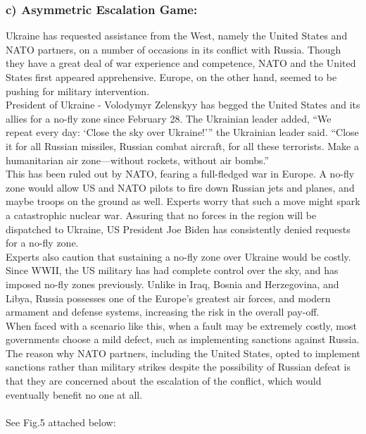 \documentclass[runningheads]{llncs}
\begin{document}
\subsubsection{c) Asymmetric Escalation Game:}
Ukraine has requested assistance from the West, namely the United States and NATO partners, on a number of occasions in its conflict with Russia. Though they have a great deal of war experience and competence, NATO and the United States first appeared apprehensive. Europe, on the other hand, seemed to be pushing for military intervention.\\
President of Ukraine - Volodymyr Zelenskyy has begged the United States and its allies for a no-fly zone since February 28. The Ukrainian leader added, “We repeat every day: ‘Close the sky over Ukraine!’” the Ukrainian leader said. “Close it for all Russian missiles, Russian combat aircraft, for all these terrorists. Make a humanitarian air zone—without rockets, without air bombs.” \\

This has been ruled out by NATO, fearing a full-fledged war in Europe. A no-fly zone would allow US and NATO pilots to fire down Russian jets and planes, and maybe troops on the ground as well. Experts worry that such a move might spark a catastrophic nuclear war. Assuring that no forces in the region will be dispatched to Ukraine, US President Joe Biden has consistently denied requests for a no-fly zone.\\

Experts also caution that sustaining a no-fly zone over Ukraine would be costly. Since WWII, the US military has had complete control over the sky, and has imposed no-fly zones previously. Unlike in Iraq, Bosnia and Herzegovina, and Libya, Russia possesses one of the Europe's greatest air forces, and modern armament and defense systems, increasing the risk in the overall pay-off.\\

When faced with a scenario like this, when a fault may be extremely costly, most governments choose a mild defect, such as implementing sanctions against Russia. The reason why NATO partners, including the United States, opted to implement sanctions rather than military strikes despite the possibility of Russian defeat is that they are concerned about the escalation of the conflict, which would eventually benefit no one at all.\\\\
See Fig.5 attached below:
\end{document}
